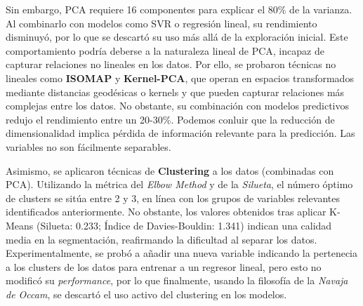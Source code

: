 \documentclass{article}
\begin{document}
Sin embargo, PCA requiere 16 componentes para explicar el 80\% de la varianza. Al combinarlo con modelos como SVR o regresión lineal, su rendimiento disminuyó, por lo que se descartó su uso 
más allá de la exploración inicial. Este comportamiento podría deberse a la naturaleza lineal de PCA, incapaz de capturar relaciones no lineales en los datos. Por ello, se probaron 
técnicas no lineales como \textbf{ISOMAP} y \textbf{Kernel-PCA}, que operan en espacios transformados mediante distancias geodésicas o kernels y que pueden capturar relaciones más complejas entre los datos. No obstante, su combinación con modelos predictivos redujo el rendimiento entre un 20-30\%. 
Podemos conluir que la reducción de dimensionalidad implica pérdida de información relevante para la predicción. Las variables no son fácilmente separables.

Asimismo, se aplicaron técnicas de \textbf{Clustering} a los datos (combinadas con PCA). Utilizando la métrica del \textit{Elbow Method} y de la \textit{Silueta}, el número óptimo de clusters  se sitúa entre 2 y 3, en línea con los grupos de variables relevantes identificados anteriormente. No obstante, los valores obtenidos tras aplicar K-Means (Silueta: 0.233; Índice de Davies-Bouldin: 1.341) indican una calidad media en la segmentación, reafirmando la dificultad al separar los datos. 
Experimentalmente, se probó a añadir una nueva variable indicando la pertenecia a los clusters de los datos para entrenar a un regresor lineal, pero esto no modificó su \textit{performance}, por lo que finalmente, usando la filosofía de la \textit{Navaja de Occam},
se descartó el uso activo del clustering en los modelos.
\end{document}
